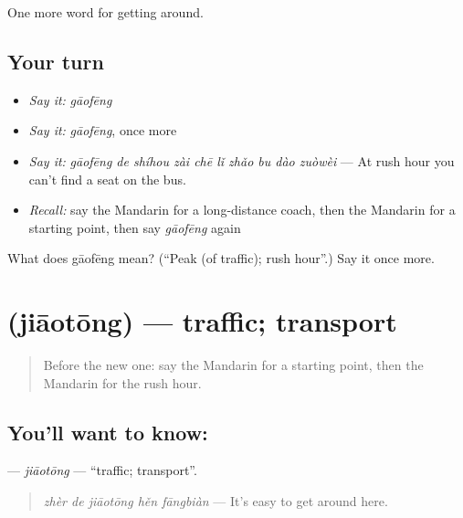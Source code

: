 \begin{grammarlens}[title={What you've built}]
One more word for getting around.
\end{grammarlens}

\subsection*{Your turn}
\begin{itemize}
\raggedright
  \item \emph{Say it:} \emph{gāofēng}
  \item \emph{Say it:} \emph{gāofēng}, once more
  \item \emph{Say it:} \emph{gāofēng de shíhou zài chē lǐ zhǎo bu dào zuòwèi} — At rush hour you can't find a seat on the bus.
  \item \emph{Recall:} say the Mandarin for a long-distance coach, then the Mandarin for a starting point, then say \emph{gāofēng} again
\end{itemize}

\begin{tcolorbox}[breakable,colback=teal!4,colframe=teal!35!black,title={Before you move on}]
What does gāofēng mean? (\textquotedblleft{}Peak (of traffic); rush hour\textquotedblright{}.) Say it once more.
\end{tcolorbox}
\section[\texorpdfstring{\zh{交通} (jiāotōng)}{交通 (jiāotōng)}]{ (jiāotōng) — traffic; transport}

\label{lesson:ZH-C409-jiaotong}



\begin{quote}
Before the new one: say the Mandarin for a starting point, then the Mandarin for the rush hour.
\end{quote}

\subsection*{You'll want to know: }
\textbf{} — \emph{jiāotōng} — \textquotedblleft{}traffic; transport\textquotedblright{}.

\begin{quote}
\emph{zhèr de jiāotōng hěn fāngbiàn} — It's easy to get around here.
\end{quote}

